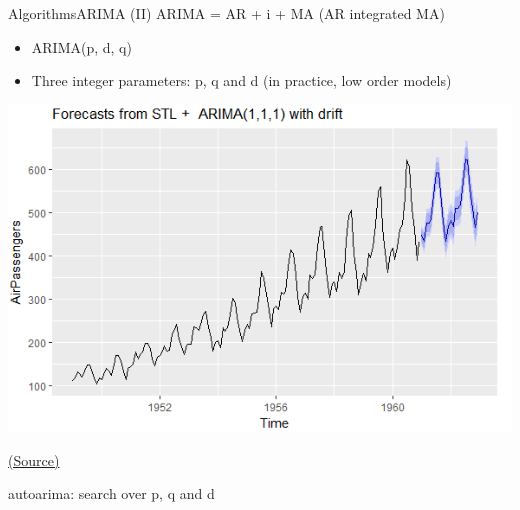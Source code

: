 \documentclass[10pt,compress]{beamer} %
\begin{document}
\begin{frame}{Algorithms}{ARIMA (II)}
	ARIMA = AR + i + MA (AR integrated MA)
    \begin{itemize}
	\item ARIMA(p, d, q)
	\item Three integer parameters: p, q and d (in practice, low order models)
    \end{itemize}

    \centering \includegraphics[width=0.6\linewidth]{figs/arima.png}

    \tiny{\href{https://itnext.io/understanding-the-forecasting-algorithm-stlf-model-29d74b3a0336?gi=282b647b24a7}{(Source)}}

    \normalsize
	\flushleft
    \alert{autoarima}: search over p, q and d
\end{frame}
\end{document}
